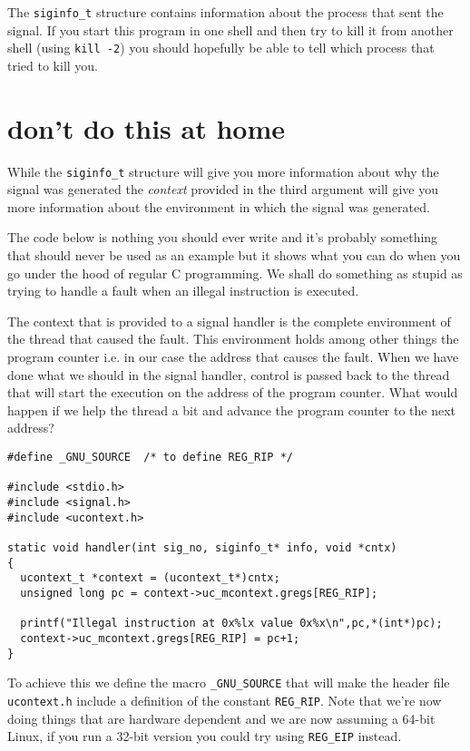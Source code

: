 \documentclass[a4paper,11pt]{article}
\begin{document}
The {\tt siginfo\_t} structure contains information about the process
that sent the signal. If you start this program in one shell and then
try to kill it from another shell (using {\tt kill -2}) you should hopefully be able to
tell which process that tried to kill you.

\section{don't do this at home}

While the {\tt siginfo\_t} structure will give you more information
about why the signal was generated the {\em context} provided in the
third argument will give you more information about the environment in
which the signal was generated. 

The code below is nothing you should ever write and it's probably
something that should never be used as an example but it shows what you
can do when you go under the hood of regular C programming. We shall
do something as stupid as trying to handle a fault when an illegal
instruction is executed.

The context that is provided to a signal handler is the complete
environment of the thread that caused the fault. This environment
holds among other things the program counter i.e. in our case the
address that causes the fault. When we have done what we should in the
signal handler, control is passed back to the thread that will
start the execution on the address of the program counter. What would
happen if we help the thread a bit and advance the program counter to
the next address?

\begin{lstlisting}
#define _GNU_SOURCE  /* to define REG_RIP */

#include <stdio.h>
#include <signal.h>
#include <ucontext.h>

static void handler(int sig_no, siginfo_t* info, void *cntx)
{
  ucontext_t *context = (ucontext_t*)cntx;
  unsigned long pc = context->uc_mcontext.gregs[REG_RIP];
  
  printf("Illegal instruction at 0x%lx value 0x%x\n",pc,*(int*)pc);
  context->uc_mcontext.gregs[REG_RIP] = pc+1;
}
\end{lstlisting}  

To achieve this we define the macro {\tt \_GNU\_SOURCE} that will make
the header file {\tt ucontext.h} include a definition of the constant
{\tt REG\_RIP}. Note that we're now doing things that are hardware
dependent and we are now assuming a 64-bit Linux, if you run a 32-bit
version you could try using {\tt REG\_EIP} instead.
\end{document}
